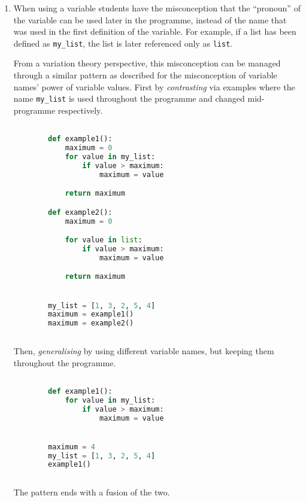\begin{enumerate}
    \item When using a variable students have the misconception that the 
      \enquote{pronoun} of the variable can be used later in the programme, 
      instead of the name that was used in the first definition of the 
      variable. For example, if a list has been defined as 
      \texttt{my_list}, the list is later referenced only as 
      \texttt{list}.

      From a variation theory perspective, this misconception can be 
managed through a similar pattern as described for the misconception 
of variable names' power of variable values. First by \emph{
contrasting} via examples where the name \texttt{my_list} 
is used throughout the programme and changed mid-programme 
respectively. 

       \begin{lstlisting}[language=Python]

        def example1():
            maximum = 0
            for value in my_list:
                if value > maximum:
                    maximum = value

            return maximum

        def example2():
            maximum = 0

            for value in list:
                if value > maximum:
                    maximum = value

            return maximum


        my_list = [1, 3, 2, 5, 4]
        maximum = example1()
        maximum = example2()
            
    \end{lstlisting}
      
      Then, \emph{generalising} by using different variable names, but 
keeping them throughout the programme. 

      \begin{lstlisting}[language=Python]

        def example1():
            for value in my_list:
                if value > maximum:
                    maximum = value


        maximum = 4
        my_list = [1, 3, 2, 5, 4]
        example1()
            
    \end{lstlisting}
      
      The pattern ends with a fusion of the two.


\end{enumerate}
